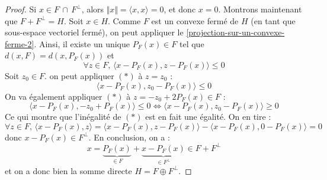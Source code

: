 	\begin{proof}
		Si $x \in F \, \cap \, F^\perp$, alors $\Vert x \Vert = \langle x, x \rangle = 0$, et donc $x = 0$. Montrons maintenant que $F + F^\perp = H$. Soit $x \in H$. Comme $F$ est un convexe fermé de $H$ (en tant que sous-espace vectoriel fermé), on peut appliquer le \cref{projection-sur-un-convexe-ferme-2}. Ainsi, il existe un unique $P_F(x) \in F$ tel que $d(x, F) = d(x, P_F(x))$ et
		\[ \forall z \in F, \, \langle x - P_F(x), z - P_F(x) \rangle \leq 0 \tag{$*$} \]
		Soit $z_0 \in F$. on peut appliquer $(*)$ à $z = z_0$ :
		\[ \langle x - P_F(x), z_0 - P_F(x) \rangle \leq 0 \]
		On va également appliquer $(*)$ à $z = -z_0 + 2P_F(x) \in F$ :
		\[ \langle x - P_F(x), -z_0 + P_F(x) \rangle \leq 0 \iff \langle x - P_F(x), z_0 - P_F(x) \rangle \geq 0 \]
		Ce qui montre que l'inégalité de $(*)$ est en fait une égalité. On en tire :
		\[ \forall z \in F, \, \langle x - P_F(x), z \rangle = \langle x - P_F(x), z - P_F(x) \rangle - \langle x - P_F(x), 0 - P_F(x) \rangle = 0 \]
		donc $x - P_F(x) \in F^\perp$. En conclusion, on a :
		\[ x = \underbrace{P_F(x)}_{\in F} + \underbrace{x - P_F(x)}_{\in F^\perp} \in F + F^\perp \]
		et on a donc bien la somme directe $H = F \oplus F^\perp$.
	\end{proof}

